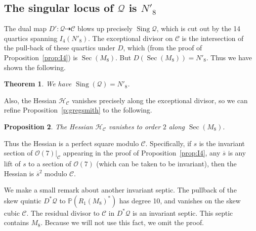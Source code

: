 \documentclass{amsart}
\newtheorem{theorem}{Theorem}[section]
\newtheorem{proposition}[theorem]{Proposition}
\theoremstyle{definition}
\theoremstyle{remark}
\DeclareMathOperator{\Sing}{Sing}
\DeclareMathOperator{\Sec}{Sec}
\def\proj{\mathbb{P}}
\def\cubic{\mathcal{C}}
\def\oh{\mathcal{O}}
\def\quintic{\mathcal{Q}}
\def\hessian{\mathcal{H}}
\begin{document}
\subsection{The singular locus of $\quintic$ is $N'_8$}
\label{s:singQ}

The dual map $D': \quintic \dashrightarrow \cubic$ blows up precisely $\Sing \quintic$, which is cut out by the 14
quartics spanning $I_4(N'_8)$.  The exceptional divisor on $\cubic$ is the intersection of the pull-back of these
quartics under $D$, which (from the proof of Proposition~\ref{prop:I4}) is $\Sec (M_8)$.  But $D(\Sec(M_8)) = N'_8$.  Thus we have shown
the following.

\begin{theorem}
\label{t:singQ}
We have $\Sing(\quintic) = N'_8$.
\end{theorem}

Also, the Hessian $\hessian_{\cubic}$ vanishes precisely along the exceptional divisor, so we can refine Proposition~\ref{p:gregsmith} to the following.

\begin{proposition}
\label{p:H2}
The Hessian $\hessian_{\cubic}$ vanishes to order $2$ along $\Sec(M_8)$.
\end{proposition}

Thus the Hessian is a perfect square modulo $\cubic$. 
Specifically, if $s$ is the invariant section of $\oh(7)|_{\cubic}$ appearing in the proof of Proposition~\ref{prop:I4}, any $\overline{s}$ is any lift of $s$ to a section of $\oh(7)$ 
(which can be taken to be invariant), then the Hessian is $\overline{s}^2$ modulo $\cubic$.

We make a small remark about another invariant septic. The pullback of the skew quintic $D^* \quintic$ to $\proj(R_1(M_8)^*)$ has degree 10, and vanishes on the skew cubic $\cubic$.  The residual divisor to $\cubic$ in $D^* \quintic$ is an invariant septic.  This septic contains $M_8$.  Because we will not use this fact, we omit the proof.
\end{document}
